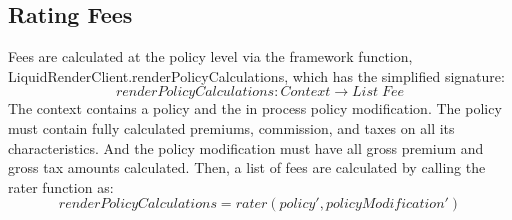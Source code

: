 \documentclass[a4paper,11pt]{article}
\begin{document}
\subsection{Rating Fees}
Fees are calculated at the policy level via the framework function, LiquidRenderClient.renderPolicyCalculations, which has the
simplified signature:
\begin{equation*}
  renderPolicyCalculations: Context \to List \; Fee
\end{equation*}
The context contains a policy and the in process policy modification. The policy must contain fully calculated premiums, commission, and taxes
on all its characteristics. And the policy modification must have all gross premium and gross tax amounts calculated.
Then, a list of fees are calculated by calling the rater function as:
\begin{equation*}
renderPolicyCalculations = rater(policy', policyModification')
\end{equation*}
\end{document}
